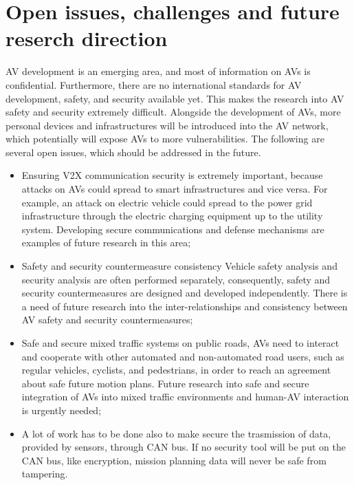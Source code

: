 \section{Open issues, challenges and future reserch direction}
    AV development is an emerging area, and most of information on AVs is confidential. Furthermore, there are no international standards for AV development, safety, and security available yet.
    This makes the research into AV safety and security extremely difficult.
    \newline
    Alongside the development of AVs, more personal devices and infrastructures will be introduced into the AV network, which potentially will expose AVs to more vulnerabilities. The following are several open issues, which should be addressed in the future.
    \begin{itemize}
        \item Ensuring V2X communication security is extremely important, because attacks on AVs could spread to smart infrastructures and vice versa. For example, an attack on electric vehicle could spread to the power grid infrastructure through the electric charging equipment up to the utility system. Developing secure communications and defense mechanisms are examples of future research in this area;
        
        \item Safety and security countermeasure consistency Vehicle safety analysis and security analysis are often performed separately, consequently, safety and security countermeasures are designed and developed independently. There is a need of future research into the inter-relationships and consistency between AV safety and security countermeasures;
        
        \item Safe and secure mixed traffic systems on public roads, AVs need to interact and cooperate with other automated and non-automated road users, such as regular vehicles, cyclists, and pedestrians, in order to reach an agreement about safe future motion plans. Future research into safe and secure integration of AVs into mixed traffic environments and human-AV interaction is urgently needed;
        
        \item A lot of work has to be done also to make secure the trasmission of data, provided by sensors, through CAN bus. If no security tool will be put on the CAN bus, like encryption, mission planning data will never be safe from tampering.
    \end{itemize}